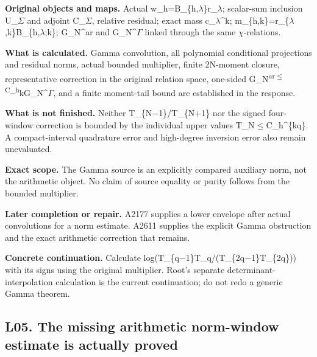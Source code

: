 \documentclass[10pt,a4paper,oneside]{report}
\begin{document}
\textbf{Original objects and maps.} Actual
w\_h=B\_\{h,\allowbreak{}\ensuremath{λ}\allowbreak{}\}r\_\allowbreak{}\ensuremath{λ}\allowbreak{};
scalar-sum inclusion U\_\allowbreak{}\ensuremath{Σ}\allowbreak{} and
adjoint C\_\allowbreak{}\ensuremath{Σ}\allowbreak{}, relative residual;
exact mass
c\_\allowbreak{}\ensuremath{λ}\allowbreak{}\textasciicircum{}k;
m\_\{h,k\}=r\_\{\allowbreak{}\ensuremath{λ}\allowbreak{},k\}B\_\{h,\allowbreak{}\ensuremath{λ}\allowbreak{};k\};
G\_N\^{}ar and
G\_N\textasciicircum{}\allowbreak{}\ensuremath{Γ}\allowbreak{} linked
through the same \allowbreak{}\ensuremath{χ}\allowbreak{}-relations.

\textbf{What is calculated.} Gamma convolution, all polynomial
conditional projections and residual norms, actual bounded multiplier,
finite 2N-moment closure, representative correction in the original
relation space, one-sided
G\_N\textsuperscript{ar\allowbreak{}\ensuremath{≤}\allowbreak{}C\_h}kG\_N\textasciicircum{}\allowbreak{}\ensuremath{Γ}\allowbreak{},
and a finite moment-tail bound are established in the response.

\textbf{What is not finished.} Neither
T\_\{N\allowbreak{}\ensuremath{−}\allowbreak{}1\}/T\_\{N+1\} nor the
signed four-window correction is bounded by the individual upper values
T\_N\allowbreak{}\ensuremath{≤}\allowbreak{}C\_h\textasciicircum{}\{kq\}.
A compact-interval quadrature error and high-degree inversion error also
remain unevaluated.

\textbf{Exact scope.} The Gamma source is an explicitly compared
auxiliary norm, not the arithmetic object. No claim of source equality
or purity follows from the bounded multiplier.

\textbf{Later completion or repair.} A2177 supplies a lower envelope
after actual convolutions for a norm estimate. A2611 supplies the
explicit Gamma obstruction and the exact arithmetic correction that
remains.

\textbf{Concrete continuation.} Calculate
log(T\_\{q\allowbreak{}\ensuremath{−}\allowbreak{}1\}T\_q/(T\_\{2q\allowbreak{}\ensuremath{−}\allowbreak{}1\}T\_\{2q\}))
with its signs using the original multiplier. Root's separate
determinant-interpolation calculation is the current continuation; do
not redo a generic Gamma theorem.

\subsection{L05. The missing arithmetic norm-window estimate is actually
proved}\label{l05.-the-missing-arithmetic-norm-window-estimate-is-actually-proved}
\end{document}

